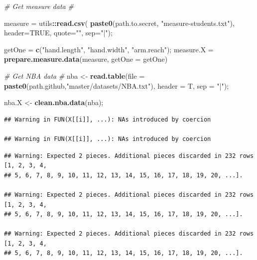 \documentclass[]{article}
\newenvironment{Shaded}{\begin{snugshade}}{\end{snugshade}}
\newcommand{\CommentTok}[1]{\textcolor[rgb]{0.56,0.35,0.01}{\textit{#1}}}
\newcommand{\DataTypeTok}[1]{\textcolor[rgb]{0.13,0.29,0.53}{#1}}
\newcommand{\KeywordTok}[1]{\textcolor[rgb]{0.13,0.29,0.53}{\textbf{#1}}}
\newcommand{\NormalTok}[1]{#1}
\newcommand{\OperatorTok}[1]{\textcolor[rgb]{0.81,0.36,0.00}{\textbf{#1}}}
\newcommand{\OtherTok}[1]{\textcolor[rgb]{0.56,0.35,0.01}{#1}}
\newcommand{\StringTok}[1]{\textcolor[rgb]{0.31,0.60,0.02}{#1}}
\begin{document}
\begin{Shaded}
\begin{Highlighting}[]
\CommentTok{# Get measure data}
\CommentTok{# }


\NormalTok{measure =}\StringTok{ }\NormalTok{utils}\OperatorTok{::}\KeywordTok{read.csv}\NormalTok{( }\KeywordTok{paste0}\NormalTok{(path.to.secret, }\StringTok{"measure-students.txt"}\NormalTok{), }
                           \DataTypeTok{header=}\OtherTok{TRUE}\NormalTok{, }\DataTypeTok{quote=}\StringTok{""}\NormalTok{, }\DataTypeTok{sep=}\StringTok{"|"}\NormalTok{);}

\NormalTok{getOne =}\StringTok{ }\KeywordTok{c}\NormalTok{(}\StringTok{"hand.length"}\NormalTok{, }\StringTok{"hand.width"}\NormalTok{, }\StringTok{"arm.reach"}\NormalTok{);}
\NormalTok{measure.X =}\StringTok{ }\KeywordTok{prepare.measure.data}\NormalTok{(measure, }
                                 \DataTypeTok{getOne =}\NormalTok{ getOne)}

\CommentTok{# Get NBA data}
\CommentTok{# }
\NormalTok{nba <-}\StringTok{ }\KeywordTok{read.table}\NormalTok{(}\DataTypeTok{file =} \KeywordTok{paste0}\NormalTok{(path.github,}\StringTok{"master/datasets/NBA.txt"}\NormalTok{),}
                  \DataTypeTok{header =}\NormalTok{ T, }
                  \DataTypeTok{sep =} \StringTok{"|"}\NormalTok{);}

\NormalTok{nba.X <-}\StringTok{ }\KeywordTok{clean.nba.data}\NormalTok{(nba);}
\end{Highlighting}
\end{Shaded}

\begin{verbatim}
## Warning in FUN(X[[i]], ...): NAs introduced by coercion

## Warning in FUN(X[[i]], ...): NAs introduced by coercion
\end{verbatim}

\begin{verbatim}
## Warning: Expected 2 pieces. Additional pieces discarded in 232 rows [1, 2, 3, 4,
## 5, 6, 7, 8, 9, 10, 11, 12, 13, 14, 15, 16, 17, 18, 19, 20, ...].

## Warning: Expected 2 pieces. Additional pieces discarded in 232 rows [1, 2, 3, 4,
## 5, 6, 7, 8, 9, 10, 11, 12, 13, 14, 15, 16, 17, 18, 19, 20, ...].

## Warning: Expected 2 pieces. Additional pieces discarded in 232 rows [1, 2, 3, 4,
## 5, 6, 7, 8, 9, 10, 11, 12, 13, 14, 15, 16, 17, 18, 19, 20, ...].
\end{verbatim}
\end{document}
